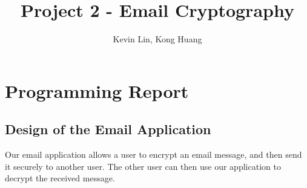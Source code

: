 \documentclass[a4paper,twoside,10pt]{report}
\begin{document}
\pagestyle{empty} %



\title{Project 2 - Email Cryptography}
\author{Kevin Lin, Kong Huang}
\maketitle



\tableofcontents %
\cleardoublepage %

\pagestyle{plain} %


\chapter{Programming Report}\label{report}

\section{Design of the Email Application}\label{members}

Our email application allows a user to encrypt an email message, and then send it securely to another user. The other user can then use our application to decrypt the received message. 
\end{document}
